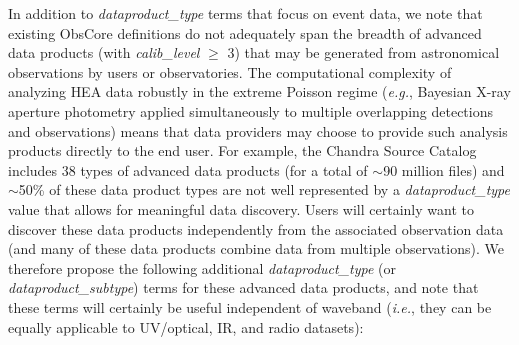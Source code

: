 \documentclass[11pt,a4paper]{ivoa}
\begin{document}

In addition to {\em dataproduct\_type} terms that focus on event data, we note that existing ObsCore definitions do not adequately span the breadth of advanced data products (with {\em calib\_level} $\ge$ 3) that may be generated from astronomical observations by users or observatories. The computational complexity of analyzing \gls{HEA} data robustly in the extreme Poisson regime ({\em e.g.\/}, Bayesian X-ray aperture photometry applied simultaneously to multiple overlapping detections and observations) means that data providers may choose to provide such analysis products directly to the end user. For example, the Chandra Source Catalog includes 38 types of advanced data products (for a total of $\sim$90 million files) and $\sim$50\% of these data product types are not well represented by a  {\em dataproduct\_type} value that allows for meaningful data discovery. Users will certainly want to discover these data products independently from the associated observation data (and many of these data products combine data from multiple observations). We therefore propose the following additional {\em dataproduct\_type} (or {\em dataproduct\_subtype}) terms for these advanced data products, and note that these terms will certainly be useful independent of waveband ({\em i.e.\/}, they can be equally applicable to UV/optical, IR, and radio datasets):
\end{document}
